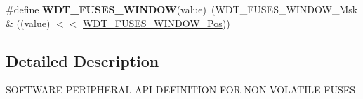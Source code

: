 \begin{DoxyCompactItemize}
\item 
\hypertarget{group__fuses__api_gab364d567f6a1f2fea15ceded96410d0d}{}\#define {\bfseries W\+D\+T\+\_\+\+F\+U\+S\+E\+S\+\_\+\+W\+I\+N\+D\+O\+W}(value)~(W\+D\+T\+\_\+\+F\+U\+S\+E\+S\+\_\+\+W\+I\+N\+D\+O\+W\+\_\+\+Msk \& ((value) $<$$<$ \hyperlink{group__fuses__api_ga79ba176ad4ff912b404632c0d0f7541e}{W\+D\+T\+\_\+\+F\+U\+S\+E\+S\+\_\+\+W\+I\+N\+D\+O\+W\+\_\+\+Pos}))\label{group__fuses__api_gab364d567f6a1f2fea15ceded96410d0d}

\end{DoxyCompactItemize}


\subsection{Detailed Description}
S\+O\+F\+T\+W\+A\+R\+E P\+E\+R\+I\+P\+H\+E\+R\+A\+L A\+P\+I D\+E\+F\+I\+N\+I\+T\+I\+O\+N F\+O\+R N\+O\+N-\/\+V\+O\+L\+A\+T\+I\+L\+E F\+U\+S\+E\+S 